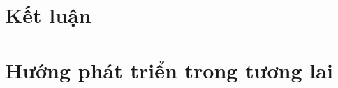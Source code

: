 \documentclass[../DoAn.tex]{subfiles}
\begin{document}
\section{Kết luận}

\section{Hướng phát triển trong tương lai}
\end{document}
